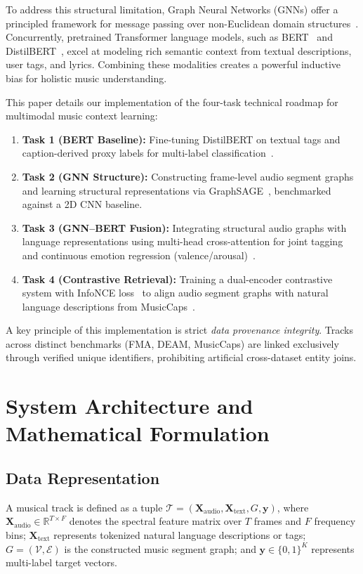 \documentclass[10pt,twocolumn]{article}
\begin{document}
To address this structural limitation, Graph Neural Networks (GNNs) offer a principled framework for message passing over non-Euclidean domain structures~\cite{graphsage, pyg}. Concurrently, pretrained Transformer language models, such as BERT~\cite{bert} and DistilBERT~\cite{distilbert}, excel at modeling rich semantic context from textual descriptions, user tags, and lyrics. Combining these modalities creates a powerful inductive bias for holistic music understanding.

This paper details our implementation of the four-task technical roadmap for multimodal music context learning:
\begin{enumerate}
    \item \textbf{Task 1 (BERT Baseline):} Fine-tuning DistilBERT on textual tags and caption-derived proxy labels for multi-label classification~\cite{distilbert}.
    \item \textbf{Task 2 (GNN Structure):} Constructing frame-level audio segment graphs and learning structural representations via GraphSAGE~\cite{graphsage, pyg}, benchmarked against a 2D CNN baseline.
    \item \textbf{Task 3 (GNN--BERT Fusion):} Integrating structural audio graphs with language representations using multi-head cross-attention for joint tagging and continuous emotion regression (valence/arousal)~\cite{deam}.
    \item \textbf{Task 4 (Contrastive Retrieval):} Training a dual-encoder contrastive system with InfoNCE loss~\cite{infonce} to align audio segment graphs with natural language descriptions from MusicCaps~\cite{musiccaps}.
\end{enumerate}

A key principle of this implementation is strict \emph{data provenance integrity}. Tracks across distinct benchmarks (FMA, DEAM, MusicCaps) are linked exclusively through verified unique identifiers, prohibiting artificial cross-dataset entity joins.

\section{System Architecture and Mathematical Formulation}

\subsection{Data Representation}
A musical track is defined as a tuple $\mathcal{T} = (\mathbf{X}_{\text{audio}}, \mathbf{X}_{\text{text}}, G, \mathbf{y})$, where $\mathbf{X}_{\text{audio}} \in \mathbb{R}^{T \times F}$ denotes the spectral feature matrix over $T$ frames and $F$ frequency bins; $\mathbf{X}_{\text{text}}$ represents tokenized natural language descriptions or tags; $G = (\mathcal{V}, \mathcal{E})$ is the constructed music segment graph; and $\mathbf{y} \in \{0, 1\}^K$ represents multi-label target vectors.
\end{document}
